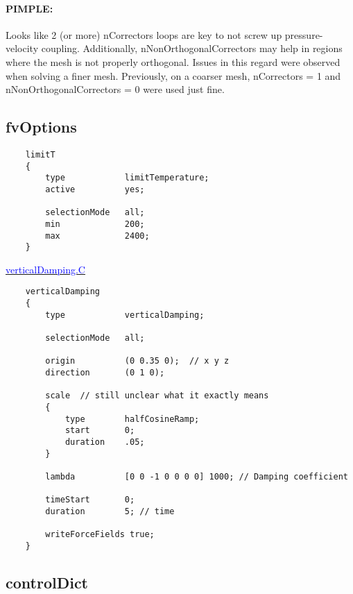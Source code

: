 \documentclass[a4paper, 12pt]{article}
\numberwithin{equation}{section}
\newcommand{\code}{\fontfamily{pcr}\selectfont}
\newcommand{\blue}[1]{\textcolor{blue}{#1}}
\begin{document}
        \paragraph{PIMPLE:\\}

            Looks like 2 (or more) {\code nCorrectors} loops are key to not screw up pressure-velocity coupling. Additionally, {\code nNonOrthogonalCorrectors} may help in regions where the mesh is not properly orthogonal. Issues in this regard were observed when solving a finer mesh. Previously, on a coarser mesh, {\code nCorrectors = 1} and {\code nNonOrthogonalCorrectors = 0} were used just fine.

    \subsection{fvOptions}

    {
    \begin{verbatim}
    limitT
    {
        type            limitTemperature;
        active          yes;

        selectionMode   all;
        min             200;
        max             2400;
    }
    \end{verbatim}
    }

    \href{
    https://github.com/OpenFOAM/OpenFOAM-12/blob/master/src/waves/fvModels/verticalDamping/verticalDamping.C
    }{\blue{verticalDamping.C}}

    {
    \begin{verbatim}
    verticalDamping
    {
        type            verticalDamping;

        selectionMode   all;

        origin          (0 0.35 0);  // x y z
        direction       (0 1 0);

        scale  // still unclear what it exactly means
        {
            type        halfCosineRamp;
            start       0;
            duration    .05;
        }

        lambda          [0 0 -1 0 0 0 0] 1000; // Damping coefficient

        timeStart       0;
        duration        5; // time

        writeForceFields true;
    }
    \end{verbatim}
    }



    \subsection{controlDict}
\end{document}
